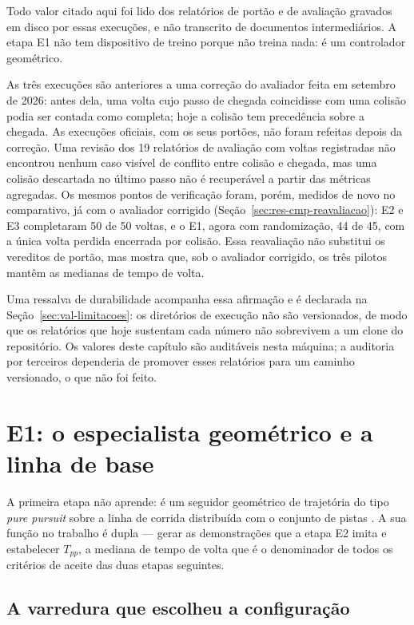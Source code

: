 Todo valor citado aqui foi lido dos relatórios de portão e de avaliação gravados
em disco por essas execuções, e não transcrito de documentos intermediários. A
etapa E1 não tem dispositivo de treino porque não treina nada: é um controlador
geométrico.

As três execuções são anteriores a uma correção do avaliador feita em setembro
de 2026: antes dela, uma volta cujo passo de chegada coincidisse com uma colisão
podia ser contada como completa; hoje a colisão tem precedência sobre a
chegada. As execuções oficiais, com os seus portões, não foram refeitas depois
da correção. Uma revisão dos 19 relatórios de avaliação com voltas registradas
não encontrou nenhum caso visível de conflito entre colisão e chegada, mas uma
colisão descartada no último passo não é recuperável a partir das métricas
agregadas. Os mesmos pontos de verificação foram, porém, medidos de novo no
comparativo, já com o avaliador corrigido
(Seção~\ref{sec:res-cmp-reavaliacao}): E2 e E3 completaram 50 de 50 voltas, e o
E1, agora com randomização, 44 de 45, com a única volta perdida encerrada por
colisão. Essa reavaliação não substitui os vereditos de portão, mas mostra que,
sob o avaliador corrigido, os três pilotos mantêm as medianas de tempo de
volta.

Uma ressalva de durabilidade acompanha essa afirmação e é declarada na
Seção~\ref{sec:val-limitacoes}: os diretórios de execução não são versionados, de
modo que os relatórios que hoje sustentam cada número não sobrevivem a um clone
do repositório. Os valores deste capítulo são auditáveis nesta máquina; a
auditoria por terceiros dependeria de promover esses relatórios para um caminho
versionado, o que não foi feito.

\section{E1: o especialista geométrico e a linha de base}\label{sec:res-e1}

A primeira etapa não aprende: é um seguidor geométrico de trajetória do tipo
\textit{pure pursuit} \cite{Coulter1992PurePursuit} sobre a linha de corrida
distribuída com o conjunto de pistas \cite{F1TENTHRaceTracks}. A sua função no
trabalho é dupla --- gerar as demonstrações que a etapa E2 imita e estabelecer
$T_{pp}$, a mediana de tempo de volta que é o denominador de todos os critérios
de aceite das duas etapas seguintes.

\subsection{A varredura que escolheu a configuração}

